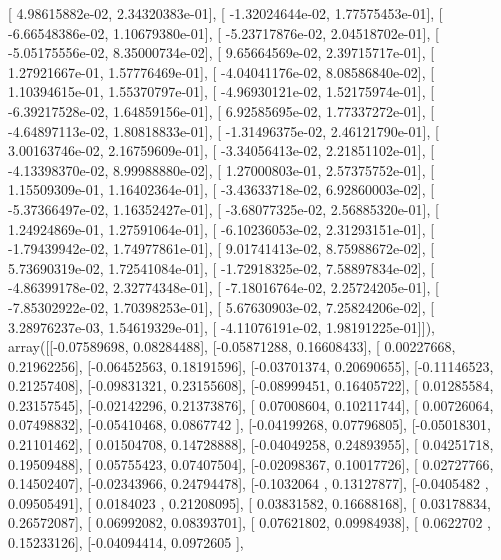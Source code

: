 \documentclass{article}
\begin{document}
       [  4.98615882e-02,   2.34320383e-01],
       [ -1.32024644e-02,   1.77575453e-01],
       [ -6.66548386e-02,   1.10679380e-01],
       [ -5.23717876e-02,   2.04518702e-01],
       [ -5.05175556e-02,   8.35000734e-02],
       [  9.65664569e-02,   2.39715717e-01],
       [  1.27921667e-01,   1.57776469e-01],
       [ -4.04041176e-02,   8.08586840e-02],
       [  1.10394615e-01,   1.55370797e-01],
       [ -4.96930121e-02,   1.52175974e-01],
       [ -6.39217528e-02,   1.64859156e-01],
       [  6.92585695e-02,   1.77337272e-01],
       [ -4.64897113e-02,   1.80818833e-01],
       [ -1.31496375e-02,   2.46121790e-01],
       [  3.00163746e-02,   2.16759609e-01],
       [ -3.34056413e-02,   2.21851102e-01],
       [ -4.13398370e-02,   8.99988880e-02],
       [  1.27000803e-01,   2.57375752e-01],
       [  1.15509309e-01,   1.16402364e-01],
       [ -3.43633718e-02,   6.92860003e-02],
       [ -5.37366497e-02,   1.16352427e-01],
       [ -3.68077325e-02,   2.56885320e-01],
       [  1.24924869e-01,   1.27591064e-01],
       [ -6.10236053e-02,   2.31293151e-01],
       [ -1.79439942e-02,   1.74977861e-01],
       [  9.01741413e-02,   8.75988672e-02],
       [  5.73690319e-02,   1.72541084e-01],
       [ -1.72918325e-02,   7.58897834e-02],
       [ -4.86399178e-02,   2.32774348e-01],
       [ -7.18016764e-02,   2.25724205e-01],
       [ -7.85302922e-02,   1.70398253e-01],
       [  5.67630903e-02,   7.25824206e-02],
       [  3.28976237e-03,   1.54619329e-01],
       [ -4.11076191e-02,   1.98191225e-01]]), array([[-0.07589698,  0.08284488],
       [-0.05871288,  0.16608433],
       [ 0.00227668,  0.21962256],
       [-0.06452563,  0.18191596],
       [-0.03701374,  0.20690655],
       [-0.11146523,  0.21257408],
       [-0.09831321,  0.23155608],
       [-0.08999451,  0.16405722],
       [ 0.01285584,  0.23157545],
       [-0.02142296,  0.21373876],
       [ 0.07008604,  0.10211744],
       [ 0.00726064,  0.07498832],
       [-0.05410468,  0.0867742 ],
       [-0.04199268,  0.07796805],
       [-0.05018301,  0.21101462],
       [ 0.01504708,  0.14728888],
       [-0.04049258,  0.24893955],
       [ 0.04251718,  0.19509488],
       [ 0.05755423,  0.07407504],
       [-0.02098367,  0.10017726],
       [ 0.02727766,  0.14502407],
       [-0.02343966,  0.24794478],
       [-0.1032064 ,  0.13127877],
       [-0.0405482 ,  0.09505491],
       [ 0.0184023 ,  0.21208095],
       [ 0.03831582,  0.16688168],
       [ 0.03178834,  0.26572087],
       [ 0.06992082,  0.08393701],
       [ 0.07621802,  0.09984938],
       [ 0.0622702 ,  0.15233126],
       [-0.04094414,  0.0972605 ],
\end{document}
